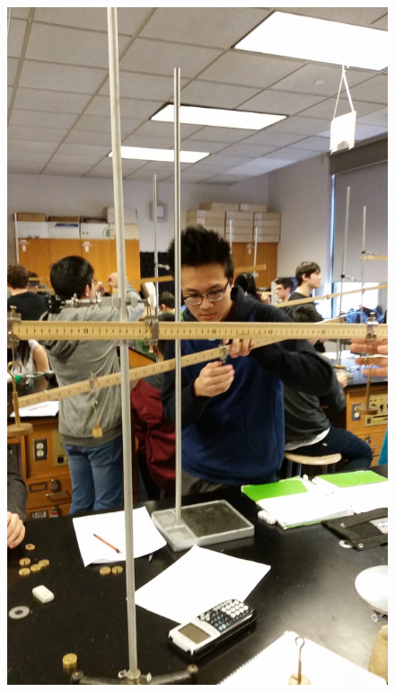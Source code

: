 \documentclass[11pt, titlepage]{article}
\begin{document}
\begin{figure}[p]
\centering
\hspace*{-10.5cm}
\includegraphics[scale=0.15, angle=270]{lab4.jpg}
\vspace*{19cm}
\end{figure}
\end{document}
